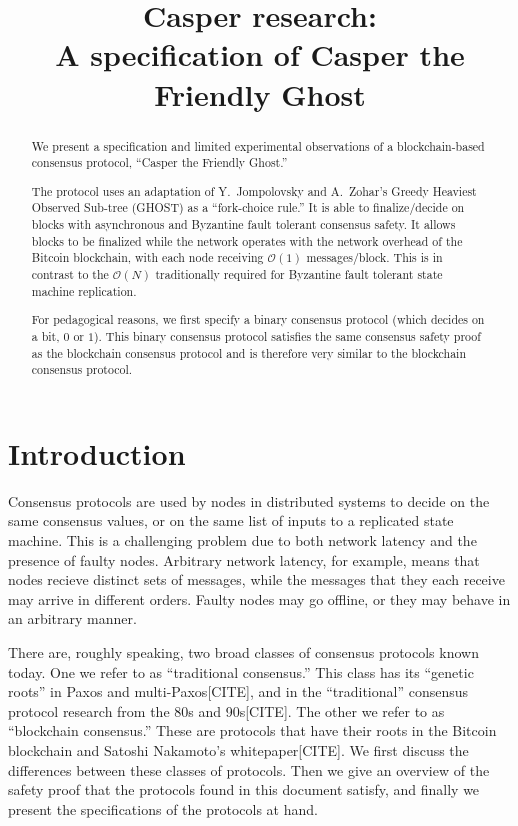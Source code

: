 \documentclass{article}
\theoremstyle{definition}
\begin{document}
\title{Casper research: \\ A specification of Casper the Friendly Ghost}
\maketitle

\begin{abstract}
We present a specification and limited experimental observations of a blockchain-based consensus protocol, ``Casper the Friendly Ghost.''

The protocol uses an adaptation of Y.\ Jompolovsky and A.\ Zohar's Greedy Heaviest Observed Sub-tree (GHOST) as a ``fork-choice rule.'' It is able to finalize/decide on blocks with asynchronous and Byzantine fault tolerant consensus safety. It allows blocks to be finalized while the network operates with the network overhead of the Bitcoin blockchain, with each node receiving $\mathcal{O}(1)$ messages/block. This is in contrast to the $\mathcal{O}(N)$ traditionally required for Byzantine fault tolerant state machine replication.

For pedagogical reasons, we first specify a binary consensus protocol (which decides on a bit, $0$ or $1$). This binary consensus protocol satisfies the same consensus safety proof as the blockchain consensus protocol and is therefore very similar to the blockchain consensus protocol.
\end{abstract}

\section{Introduction}

Consensus protocols are used by nodes in distributed systems to decide on the same consensus values, or on the same list of inputs to a replicated state machine. This is a challenging problem due to both network latency and the presence of faulty nodes. Arbitrary network latency, for example, means that nodes recieve distinct sets of messages, while the messages that they each receive may arrive in different orders. Faulty nodes may go offline, or they may behave in an arbitrary manner.

There are, roughly speaking, two broad classes of consensus protocols known today. One we refer to as ``traditional consensus.'' This class has its ``genetic roots'' in Paxos and multi-Paxos[CITE], and in the ``traditional'' consensus protocol research from the 80s and 90s[CITE]. The other we refer to as ``blockchain consensus.'' These are protocols that have their roots in the Bitcoin blockchain and Satoshi Nakamoto's whitepaper[CITE]. We first discuss the differences between these classes of protocols. Then we give an overview of the safety proof that the protocols found in this document satisfy, and finally we present the specifications of the protocols at hand.
\end{document}
